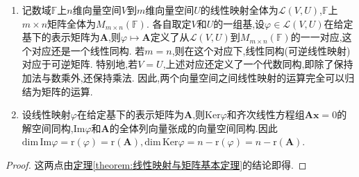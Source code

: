 \documentclass[../../main.tex]{subfiles}
\begin{document}
\begin{corollary}\label{corollary:线性映射与矩阵基本结论}
\begin{enumerate}[(1)]
\item\label{线性映射与矩阵基本结论1} 记数域\(\mathbb{F}\)上\(n\)维向量空间\(V\)到\(m\)维向量空间\(U\)的线性映射全体为\(\mathcal{L}(V,U)\),\(\mathbb{F}\)上\(m\times n\)矩阵全体为\(M_{m\times n}(\mathbb{F})\). 各自取定\(V\)和\(U\)的一组基,设\(\varphi\in\mathcal{L}(V,U)\)在给定基下的表示矩阵为\(\boldsymbol{A}\),则\(\varphi\mapsto\boldsymbol{A}\)定义了从\(\mathcal{L}(V,U)\)到\(M_{m\times n}(\mathbb{F})\)的一一对应,这个对应还是一个线性同构. 若\(m = n\),则在这个对应下,线性同构(可逆线性映射)对应于可逆矩阵. 特别地,若\(V = U\),上述对应还定义了一个代数同构,即除了保持加法与数乘外,还保持乘法. 因此,两个向量空间之间线性映射的运算完全可以归结为矩阵的运算.

\item\label{线性映射与矩阵基本结论2} 设线性映射\(\varphi\)在给定基下的表示矩阵为\(\boldsymbol{A}\),则\(\text{Ker}\varphi\)和齐次线性方程组\(\boldsymbol{A}\boldsymbol{x}=0\)的解空间同构,\(\text{Im}\varphi\)和\(\boldsymbol{A}\)的全体列向量张成的向量空间同构.因此$\mathrm{dim}\,\mathrm{Im}\varphi =\mathrm{r}\left( \varphi \right) =\mathrm{r}\left( \boldsymbol{A} \right) ,\mathrm{dim}\,\mathrm{Ker}\varphi =n-\mathrm{r}\left( \varphi \right) =n-\mathrm{r}\left( \boldsymbol{A} \right)$.
\end{enumerate}
\end{corollary}
\begin{proof}
这两点由\hyperref[theorem:线性映射与矩阵基本定理]{定理\ref{theorem:线性映射与矩阵基本定理}}的结论即得.
\end{proof}
\end{document}
